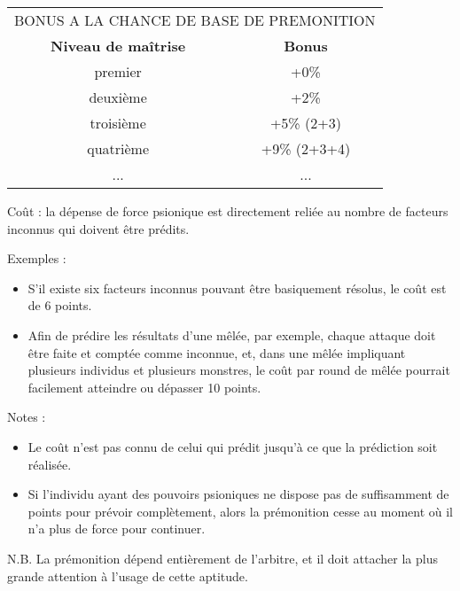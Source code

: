 \bigskip

\begin{tabular}{cc}
\multicolumn{2}{c}{BONUS A LA CHANCE DE BASE DE PREMONITION} \\
\textbf{Niveau de maîtrise} & \textbf{Bonus} \\
premier     & +0\% \\
deuxième    & +2\% \\
troisième   & +5\% (2+3) \\
quatrième   & +9\% (2+3+4) \\
...         & ... \\
\end{tabular}

\bigskip

Coût : la dépense de force psionique est directement reliée au nombre de facteurs inconnus qui doivent être prédits.

\bigskip

Exemples :

\bigskip

\begin{itemize}
\item S'il existe six facteurs inconnus pouvant être basiquement résolus, le coût est de 6 points.
\item Afin de prédire les résultats d'une mêlée, par exemple, chaque attaque doit être faite et comptée comme inconnue, et, dans une mêlée impliquant plusieurs individus et plusieurs monstres, le coût par round de mêlée pourrait facilement atteindre ou dépasser 10 points.
\end{itemize}

\bigskip

Notes :

\bigskip

\begin{itemize}
\item Le coût n'est pas connu de celui qui prédit jusqu'à ce que la prédiction soit réalisée.
\item Si l'individu ayant des pouvoirs psioniques ne dispose pas de suffisamment de points pour prévoir complètement, alors la prémonition cesse au moment où il n'a plus de force pour continuer.
\end{itemize}

\bigskip

N.B. La prémonition dépend entièrement de l'arbitre, et il doit attacher la plus grande attention à l'usage de cette aptitude.

\bigskip


